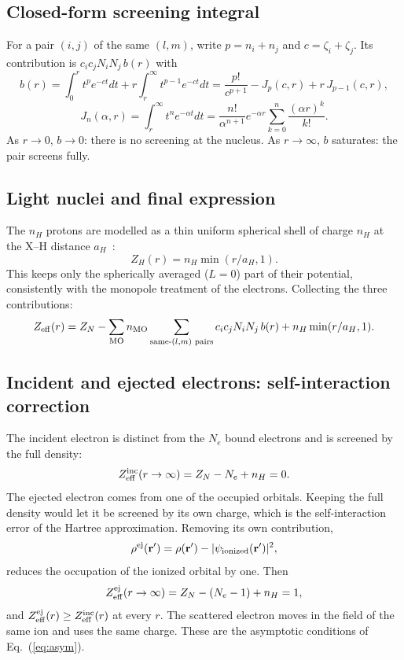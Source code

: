 \documentclass[11pt,a4paper]{article}
\newcommand{\br}{\mathbf r}
\begin{document}
\subsection{Closed-form screening integral}
For a pair $(i,j)$ of the same $(l,m)$, write $p=n_i+n_j$ and $c=\zeta_i+\zeta_j$. Its contribution
is $c_ic_jN_iN_j\,b(r)$ with
\begin{equation}
b(r)=\int_0^rt^pe^{-ct}dt+r\int_r^\infty t^{p-1}e^{-ct}dt
=\frac{p!}{c^{p+1}}-J_p(c,r)+r\,J_{p-1}(c,r),
\end{equation}
\begin{equation}
J_n(\alpha,r)=\int_r^\infty t^ne^{-\alpha t}dt=\frac{n!}{\alpha^{n+1}}e^{-\alpha r}\sum_{k=0}^n\frac{(\alpha r)^k}{k!}.
\end{equation}
As $r\to0$, $b\to0$: there is no screening at the nucleus. As $r\to\infty$, $b$ saturates: the
pair screens fully.

\subsection{Light nuclei and final expression}
The $n_H$ protons are modelled as a thin uniform spherical shell of charge $n_H$ at the X--H
distance $a_H$~\cite{Jackson1998}:
\begin{equation}
Z_H(r)=n_H\min(r/a_H,1).
\end{equation}
This keeps only the spherically averaged ($L=0$) part of their potential, consistently with the
monopole treatment of the electrons. Collecting the three contributions:
\begin{equation}
Z_{\rm eff}(r)=Z_N-\sum_{\rm MO}n_{\rm MO}\sum_{\text{same-}(l,m)\text{ pairs}}c_ic_jN_iN_j\,b(r)
+n_H\min(r/a_H,1).
\label{eq:zfinal}
\end{equation}

\subsection{Incident and ejected electrons: self-interaction correction}
The incident electron is distinct from the $N_e$ bound electrons and is screened by the full
density:
\begin{equation}
Z^{\rm inc}_{\rm eff}(r\to\infty)=Z_N-N_e+n_H=0.
\end{equation}
The ejected electron comes from one of the occupied orbitals. Keeping the full density would let
it be screened by its own charge, which is the self-interaction error of the Hartree
approximation. Removing its own contribution,
\begin{equation}
\rho^{\rm ej}(\br')=\rho(\br')-|\psi_{\rm ionized}(\br')|^2 ,
\end{equation}
reduces the occupation of the ionized orbital by one. Then
\begin{equation}
Z^{\rm ej}_{\rm eff}(r\to\infty)=Z_N-(N_e-1)+n_H=1,
\end{equation}
and $Z^{\rm ej}_{\rm eff}(r)\ge Z^{\rm inc}_{\rm eff}(r)$ at every $r$. The scattered electron
moves in the field of the same ion and uses the same charge. These are the asymptotic conditions
of Eq.~(\ref{eq:asym}).
\end{document}

